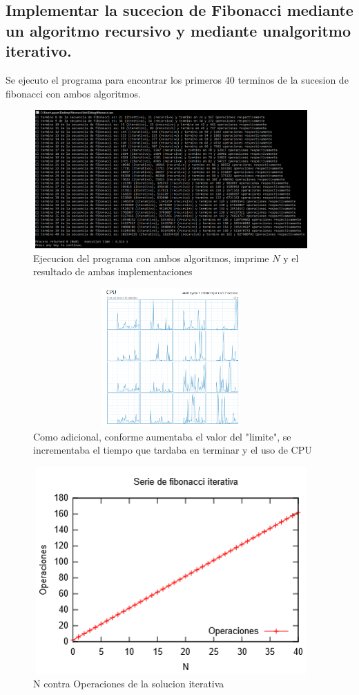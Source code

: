 \documentclass[spanish]{article}
\begin{document}
		\subsection{Implementar la sucecion de Fibonacci mediante un algoritmo recursivo y mediante unalgoritmo iterativo.}
			Se ejecuto el programa para encontrar los primeros 40 terminos de la sucesion de fibonacci con ambos algoritmos.			
			\begin{figure}[h!]
				\centering
				\includegraphics[width=400px,height=200px]{ejecucionPrimeraParte}
				\caption{Ejecucion del programa con ambos algoritmos, imprime $N$ y el resultado de ambas implementaciones}
			\end{figure}
			\begin{figure}[H]
				\centering
				\includegraphics[width=400px,height=200px]{cpu}
				\caption{Como adicional, conforme aumentaba el valor del "limite", se incrementaba el tiempo que tardaba en terminar y el uso de CPU}
			\end{figure}
			\begin{figure}[H]
				\centering
				\includegraphics[width=400px,height=300px]{grafica1}
				\caption{N contra Operaciones de la solucion iterativa}
			\end{figure}
\end{document}
